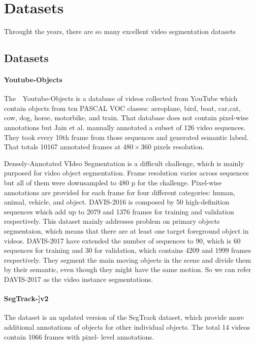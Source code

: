 \section{Datasets}
Throught the years,  there are so many excellent video segmentation datasets
\subsection{Datasets}
\paragraph{Youtube-Objects~\cite{Youtube}} 
The　Youtube-Objects is a database of videos collected from YouTube which contain objects from ten PASCAL VOC classes: 
aeroplane, bird, boat, car,cat, cow, dog, horse, motorbike, and train.
 That database does not contain pixel-wise annotations but Jain et al. 
\cite{tang2013discriminative} 
manually annotated a subset of 126 video sequences.
They took every 10th frame from those sequences and generated semantic labesl. 
That totals 10167 annotated frames at $480\times 360$ pixels resolution.


Densely-Annotated VIdeo Segmentation is a  difficult challenge, which is mainly purposed for video object segmentation.
Frame resolution varies across sequences but all of them were downsampled to 480 p for the challenge. 
Pixel-wise annotations are provided for each frame for four different categories: human, animal, vehicle, and object.
DAVIS-2016 \cite{DAVIS2016}is composed by 50 high-definition sequences which add up to 2079 and 1376 frames for training and validation respectively.
This dataset mainly addresses problem on primary objects segmentaion, which means that there are at least one target foreground object in videos.
DAVIS-2017 \cite{DAVIS2017} have extended the number of sequences to 90, which is 60 sequences for training and 30 for validation, which contains 4209 and 1999 frames respectively.
They segment the main moving objects in the scene and divide them by their semantic, even though they might have the same motion. So we can refer DAVIS-2017 as the video instance segmentations.


\paragraph{SegTrack-]v2~\cite{SegTrack}}
The dataset is an updated version of the SegTrack dataset, which provide more additional
annotations of objects for other individual objects. The total 14 videos contain 1066 frames with pixel-
level annotations. 


